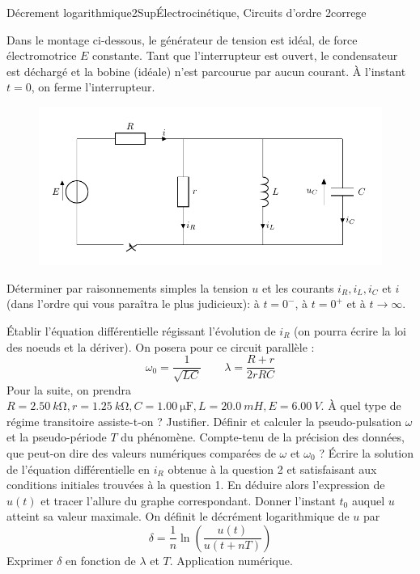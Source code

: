
\begin{exercise}{Décrement logarithmique}{2}{Sup}{\'Electrocinétique, Circuits d'ordre 2}{correge}

Dans le montage ci-dessous, le générateur de tension est idéal, de force électromotrice $E$ constante. Tant que l'interrupteur est ouvert, le condensateur est déchargé et la bobine (idéale) n'est parcourue par aucun courant. À l'instant $t=0$, on ferme l'interrupteur.

\begin{figure}[H]
\centering
\includegraphics[scale=1]{elec/circuitDecrement.pdf}
\end{figure}

\begin{questions}
    \question Déterminer par raisonnements simples la tension $u$ et les courants $i_R, i_L,i_C$ et $i$ (dans l'ordre qui vous paraîtra le plus judicieux):  à $t=0^-$, à $t=0^+$ et à $t\to \infty$.
    
    \question Établir l'équation différentielle régissant l'évolution de $i_R$ (on pourra écrire la loi des noeuds et la dériver). On posera pour ce circuit parallèle :
              \[\omega_0 = \frac{1}{\sqrt{LC}} \qquad \lambda = \frac{R+r}{2rRC}\]
    \question Pour la suite, on prendra $R=\SI{2,50}{k\ohm}, r=\SI{1,25}{k\ohm}, C=\SI{1,00}{\micro\farad}, L=\SI{20,0}{mH}, E=\SI{6,00}{V}$. À quel type de régime transitoire assiste-t-on ? Justifier.
    \question Définir et calculer la pseudo-pulsation $\omega$ et la pseudo-période $T$ du phénomène. Compte-tenu de la précision des données, que peut-on dire des valeurs numériques comparées de $\omega$ et $\omega_0$ ?
    \question Écrire la solution de l'équation différentielle en $i_R$ obtenue à la question 2 et satisfaisant aux conditions initiales trouvées à la question 1.
    \question En déduire alors l'expression de $u(t)$ et tracer l'allure du graphe correspondant. Donner l'instant $t_0$ auquel $u$ atteint sa valeur maximale.
    \question On définit le décrément logarithmique de $u$ par 
              \[\delta = \frac{1}{n}\ln\left(\frac{u(t)}{u(t+nT)}\right)\]
              Exprimer $\delta$ en fonction de $\lambda$ et $T$. Application numérique.
\end{questions}
\end{exercise}